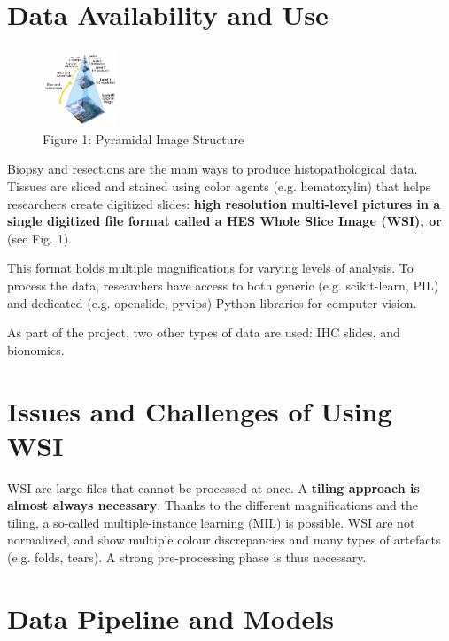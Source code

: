 \documentclass[a4paper, 10pt]{article}
\begin{document}
\section{Data Availability and Use}

\begin{figure} %
    \centering
    \includegraphics[width=0.2\textwidth]{pyramid}\\
    {\scriptsize Figure 1: Pyramidal Image Structure}
\end{figure}

Biopsy and resections are the main ways to produce histopathological data. Tissues are sliced and stained using color agents (e.g. hematoxylin) that helps researchers create digitized slides: \textbf{high resolution multi-level pictures in a single digitized file format called a HES Whole Slice Image (WSI), or } (see Fig. 1).

This format holds multiple magnifications for varying levels of analysis. To process the data, researchers have access to both generic (e.g. scikit-learn, PIL) and dedicated (e.g. openslide, pyvips) Python libraries for computer vision.

As part of the project, two other types of data are used: IHC slides, and bionomics.

\section{Issues and Challenges of Using WSI}

WSI are large files that cannot be processed at once. A \textbf{tiling approach is almost always necessary}. Thanks to the different magnifications and the tiling, a so-called multiple-instance learning (MIL) is possible. WSI are not normalized, and show multiple colour discrepancies and many types of artefacts (e.g. folds, tears). A strong pre-processing phase is thus necessary.

\section{Data Pipeline and Models}
\end{document}
